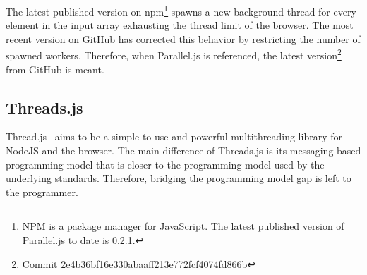 \begin{remark}
The latest published version on npm\footnote{NPM is a package manager for JavaScript. The latest published version of Parallel.js to date is 0.2.1.} spawns a new background thread for every element in the input array exhausting the thread limit of the browser. The most recent version on GitHub has corrected this behavior by restricting the number of spawned workers. Therefore, when Parallel.js is referenced, the latest version\footnote{Commit 2e4b36bf16e330abaaff213e772fcf4074fd866b} from GitHub is meant.	
\end{remark}

\subsection{Threads.js}
Thread.js~\cite{Wermke2016} aims to be a simple to use and powerful multithreading library for NodeJS and the browser. The main difference of Threads.js is its messaging-based programming model that is closer to the programming model used by the underlying standards. Therefore, bridging the programming model gap is left to the programmer.